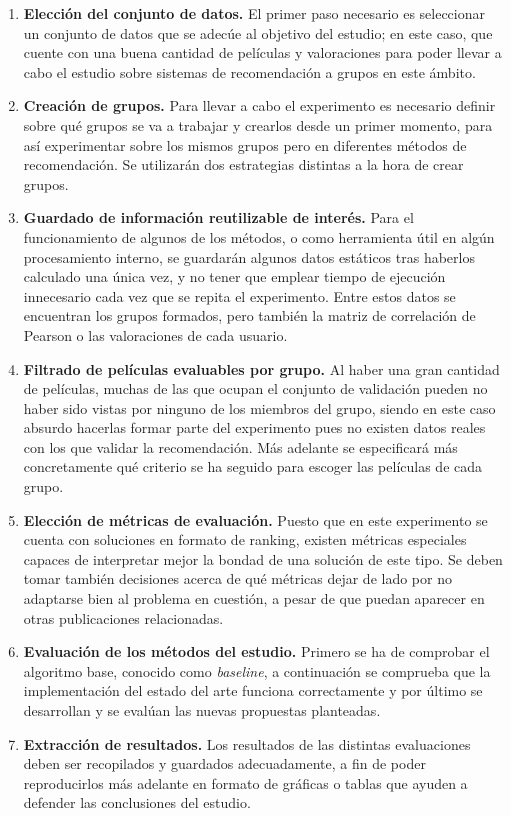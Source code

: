 \begin{enumerate}
	\item \textbf{Elección del conjunto de datos.} El primer paso necesario es seleccionar un conjunto de datos que se adecúe al objetivo del estudio; en este caso, que cuente con una buena cantidad de películas y valoraciones para poder llevar a cabo el estudio sobre sistemas de recomendación a grupos en este ámbito.
	\item \textbf{Creación de grupos.} Para llevar a cabo el experimento es necesario definir sobre qué grupos se va a trabajar y crearlos desde un primer momento, para así experimentar sobre los mismos grupos pero en diferentes métodos de recomendación. Se utilizarán dos estrategias distintas a la hora de crear grupos.
	\item \textbf{Guardado de información reutilizable de interés.} Para el funcionamiento de algunos de los métodos, o como herramienta útil en algún procesamiento interno, se guardarán algunos datos estáticos tras haberlos calculado una única vez, y no tener que emplear tiempo de ejecución innecesario cada vez que se repita el experimento. Entre estos datos se encuentran los grupos formados, pero también la matriz de correlación de Pearson o las valoraciones de cada usuario.
	\item \textbf{Filtrado de películas evaluables por grupo.} Al haber una gran cantidad de películas, muchas de las que ocupan el conjunto de validación pueden no haber sido vistas por ninguno de los miembros del grupo, siendo en este caso absurdo hacerlas formar parte del experimento pues no existen datos reales con los que validar la recomendación. Más adelante se especificará más concretamente qué criterio se ha seguido para escoger las películas de cada grupo.
	\item \textbf{Elección de métricas de evaluación.} Puesto que en este experimento se cuenta con soluciones en formato de ranking, existen métricas especiales capaces de interpretar mejor la bondad de una solución de este tipo. Se deben tomar también decisiones acerca de qué métricas dejar de lado por no adaptarse bien al problema en cuestión, a pesar de que puedan aparecer en otras publicaciones relacionadas.
	\item \textbf{Evaluación de los métodos del estudio.} Primero se ha de comprobar el algoritmo base, conocido como \textit{baseline}, a continuación se comprueba que la implementación del estado del arte funciona correctamente y por último se desarrollan y se evalúan las nuevas propuestas planteadas.
	\item \textbf{Extracción de resultados.} Los resultados de las distintas evaluaciones deben ser recopilados y guardados adecuadamente, a fin de poder reproducirlos más adelante en formato de gráficas o tablas que ayuden a defender las conclusiones del estudio.
\end{enumerate}

